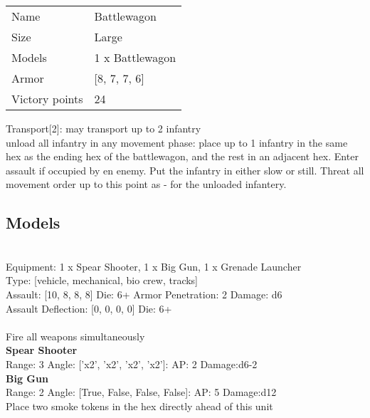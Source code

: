 \begin{tabular}{ll}
  Name & Battlewagon \\
  Size & Large\\
  Models & 1 x Battlewagon\\
  Armor & [8, 7, 7, 6]\\
  Victory points & 24\\
\end{tabular}

Transport[2]: may transport up to 2 infantry\\ 
unload all infantry in any movement phase: place up to 1 infantry in the same hex as the ending hex of the battlewagon, and the rest in an adjacent hex. Enter assault if occupied by en enemy. Put the infantry in either slow or still. Threat all movement order up to this point as - for the unloaded infantery.\\ 


\subsection{ Models }

 \\
Equipment: 1 x Spear Shooter, 1 x Big Gun, 1 x Grenade Launcher \\
Type: [vehicle, mechanical, bio crew, tracks] \\

Assault: [10, 8, 8, 8] Die: 6+ Armor Penetration: 2 Damage: d6 \\
Assault Deflection: [0, 0, 0, 0] Die: 6+\\
\\ 
 

Fire all weapons simultaneously\\ 


{\bf Spear Shooter } \\



Range: 3  Angle: ['x2', 'x2', 'x2', 'x2']: AP: 2 Damage:d6-2 \\




{\bf Big Gun } \\



Range: 2  Angle: [True, False, False, False]: AP: 5 Damage:d12 \\
Place two smoke tokens in the hex directly ahead of this unit\\ 




